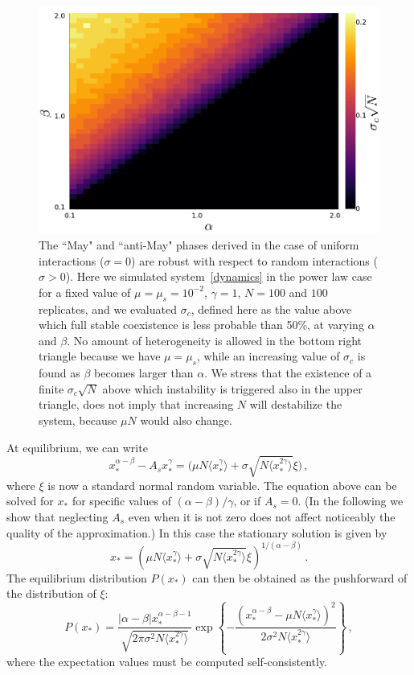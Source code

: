 \begin{figure}[t!]
    \includegraphics[width=.45\textwidth]{figs/alpha-beta.pdf}
    \caption{The ``May" and ``anti-May" phases derived in the
    case of uniform interactions ($\sigma = 0$) are robust with respect to random interactions ($\sigma > 0$).
    Here we simulated system~\eqref{dynamics} in the power law case for a fixed value of
    $\mu=\mu_s=10^{-2}$, $\gamma=1$, $N=100$ and $100$ replicates,  
    and we evaluated $\sigma_c$, defined here as
    the value above which full stable coexistence is less probable than 50\%,
    at varying $\alpha$ and $\beta$.
    No amount of heterogeneity is allowed in the bottom right triangle because we have $\mu=\mu_s$, while an increasing value of $\sigma_c$
    is found as $\beta$ becomes larger than $\alpha$.
    We stress that the existence of a finite $\sigma_c\sqrt{N}$ above which instability is triggered also in the upper triangle,
    does not imply that increasing $N$ will destabilize the system, because $\mu N$ would also change.
    }
    \label{fig: alpha-beta}
\end{figure}
At equilibrium, we can write
\begin{equation}
    x_*^{\alpha-\beta} - A_s x_*^{\gamma}= \big( \mu N \langle x_*^{\gamma}\rangle + \sigma \sqrt{N\langle x_*^{2\gamma}\rangle}\xi\big) \, ,
\end{equation} 
where $\xi$ is now a standard normal random variable.
The equation above can be solved for $x_*$ for specific values of
$(\alpha-\beta)/\gamma$, or if $A_s=0$.
(In the following we show that neglecting $A_s$ even when it is not zero does not affect noticeably the quality of the approximation.) In this case the stationary solution is given by 
\begin{equation} \label{eq: cavity solution}
    x_* = \left( \mu N \langle x_*^{\gamma}\rangle + \sigma \sqrt{N\langle x_*^{2\gamma}\rangle}\xi\right)^{1/(\alpha-\beta)} \, .
\end{equation}
The equilibrium distribution $P(x_*)$ can then be obtained as the pushforward of the distribution of $\xi$: 
\begin{equation}\label{eq: dist general}
    P(x_*)=\frac{|\alpha-\beta|x_*^{\alpha-\beta-1}}{\sqrt{2\pi\sigma^2 N\langle x_*^{2\gamma}\rangle}}
    \exp{\left\{-\frac{(x_*^{\alpha-\beta}-\mu N\langle x_*^{\gamma}\rangle)^2}{2\sigma^2N\langle x_*^{2\gamma}\rangle}\right\}} \, ,
\end{equation}
where the expectation values must be computed self-consistently. 

